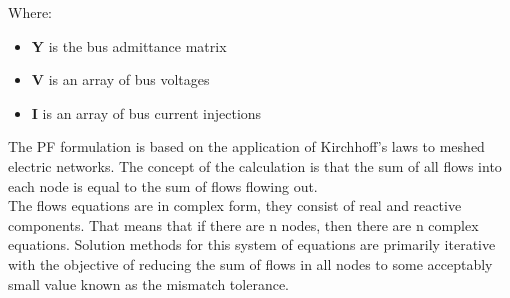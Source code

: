  

\noindent Where:
\begin{itemize}
    \item \textbf{Y} is the bus admittance matrix
    \item \textbf{V} is an array of bus voltages
    \item \textbf{I} is an array of bus current injections %
\end{itemize}

The \gls{PF} formulation is based on the application of Kirchhoff’s laws to meshed electric networks. The concept of the  calculation is that the sum of all flows into each node is equal to the sum of flows flowing out.\\
The flows equations are in complex form, they consist of real and reactive components. That means that if there are n nodes, then there are n complex equations. 
Solution methods for this system of equations are primarily iterative with the objective of reducing the sum of flows in all nodes to some acceptably small value known as the mismatch tolerance. \\

